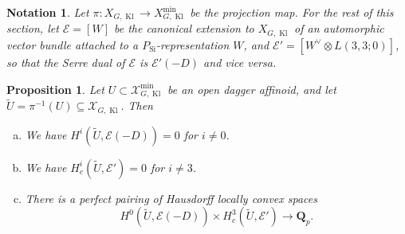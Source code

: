 \documentclass[cjm]{ipart}
\theoremstyle{plain}
\newtheorem{proposition}[theorem]{Proposition}
\newtheorem{notation}[theorem]{Notation}
\theoremstyle{remark}
\DeclareMathOperator{\Kl}{Kl}
\DeclareMathOperator{\Sieg}{Si}
\newcommand{\QQ}{\mathbf{Q}}
\newcommand{\Qp}{\QQ_p}
\newcommand{\cE}{\mathcal{E}}
\newcommand{\cX}{\mathcal{X}}
\numberwithin{equation}{subsection}
\begin{document}
  \begin{notation}
   Let $\pi: X_{G,\Kl} \to X_{G,\Kl}^{\mathrm{min}}$ be the projection map. For the rest of this section, let $\cE = [W]$ be the canonical extension to $X_{G,\Kl}$ of an automorphic vector bundle attached to a $P_{\Sieg}$-representation $W$, and $\cE' = [W^\vee \otimes L(3, 3; 0)]$, so that the Serre dual of $\cE$ is $\cE'(-D)$ and vice versa.
  \end{notation}

  \begin{proposition}
   Let $U \subset \cX_{G, \Kl}^{\mathrm{min}}$ be an open dagger affinoid, and let $\tilde U = \pi^{-1}(U) \subseteq \cX_{G, \Kl}$. Then
   \begin{enumerate}[(a)]
    \item We have $H^i(\tilde U, \cE(-D)) = 0$ for $i \ne 0$.
    \item We have $H^i_c(\tilde U, \cE') = 0$ for $i \ne 3$.
    \item There is a perfect pairing of Hausdorff locally convex spaces
    \[ H^0(\tilde U, \cE(-D)) \times H^{3}_c(\tilde U, \cE') \to \Qp. \]
   \end{enumerate}
  \end{proposition}
\end{document}
